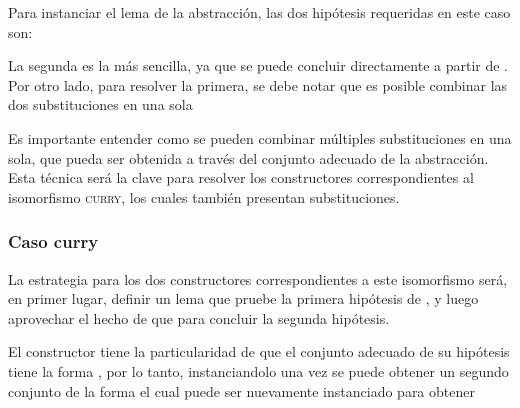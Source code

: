 Para instanciar el lema de la abstracción, las dos hipótesis requeridas en este caso son:

\snstar
{}

\snstar
\subst
{\cons
	{\const{[}  \const{]≡} }
	{}}
{}

La segunda es la más sencilla, ya que se puede concluir directamente a partir de .
Por otro lado, para resolver la primera, se debe notar que es posible combinar las dos substituciones en una sola 
\subst
{\cons
	{\const{[}  \const{]≡} }
	{\parens{\comp{\ids}{\bound{$\rho$}}}}}
{}


Es importante entender como se pueden combinar múltiples substituciones en una sola, que pueda ser obtenida a través del conjunto adecuado de la abstracción.
Esta técnica será la clave para resolver los constructores correspondientes al isomorfismo \textsc{curry}, los cuales también presentan substituciones.

\subsubsection{Caso curry}

La estrategia para los dos constructores correspondientes a este isomorfismo será, en primer lugar, definir un lema que pruebe la primera hipótesis de , y luego aprovechar el hecho de que
  
para concluir la segunda hipótesis.

El constructor  tiene la particularidad de que el conjunto adecuado de su hipótesis tiene la forma 
, por lo tanto, instanciandolo una vez se puede obtener un segundo conjunto de la forma
el cual puede ser nuevamente instanciado para obtener


